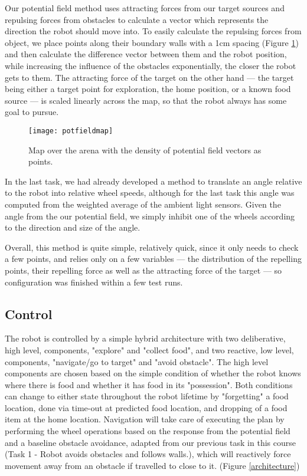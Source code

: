 \documentclass[paper=a4, fontsize=12pt]{scrartcl}	%
\numberwithin{equation}{section}		%
\numberwithin{figure}{section}			%
\numberwithin{table}{section}				%
\begin{document}
Our potential field method uses attracting forces from our target sources and repulsing forces from obstacles to calculate a vector which represents the direction the robot should move into. To easily calculate the repulsing forces from object, we place points along their boundary walls with a 1cm spacing (Figure \ref{potfieldmap}) and then calculate the difference vector between them and the robot position, while increasing the influence of the obstacles exponentially, the closer the robot gets to them. The attracting force of the target on the other hand --- the target being either a target point for exploration, the home position, or a known food source --- is scaled linearly across the map, so that the robot always has some goal to pursue. 

\begin{figure}[!ht]
 \centering
  \texttt{[image: potfieldmap]}
  \caption{Map over the arena with the density of potential field vectors as points.}
\label{potfieldmap}
\end{figure}

In the last task, we had already developed a method to translate an angle relative to the robot into relative wheel speeds, although for the last task this angle was computed from the weighted average of the ambient light sensors. Given the angle from the our potential field, we simply inhibit one of the wheels according to the direction and size of the angle.

Overall, this method is quite simple, relatively quick, since it only needs to check a few points, and relies only on a few variables --- the distribution of the repelling points, their repelling force as well as the attracting force of the target --- so configuration was finished within a few test runs.

\subsection{Control}
The robot is controlled by a simple hybrid architecture with two deliberative, high level, components, "explore" and "collect food", and two reactive, low level, components, "navigate/go to target" and "avoid obstacle". The high level components are chosen based on the simple condition of whether the robot knows where there is food and whether it has food in its "possession". Both conditions can change to either state throughout the robot lifetime by "forgetting" a food location, done via time-out at predicted food location, and dropping of a food item at the home location. Navigation will take care of executing the plan by performing the wheel operations based on the response from the potential field and a baseline obstacle avoidance, adapted from our previous task in this course (Task 1 - Robot avoids obstacles and follows walls.), which will reactively force movement away from an obstacle if travelled to close to it. (Figure \ref{architecture})
\end{document}
